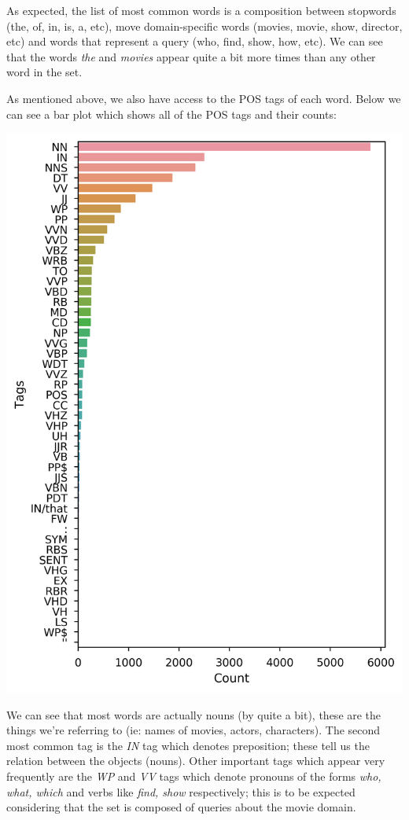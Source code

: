 \documentclass[11pt,a4paper]{article}
\begin{document}
	As expected, the list of most common words is a composition between stopwords (the, of, in, is, a, etc), move domain-specific words (movies, movie, show, director, etc) and words that represent a query (who, find, show, how, etc). We can see that the words \textit{the} and \textit{movies} appear quite a bit more times than any other word in the set.
	
	As mentioned above, we also have access to the POS tags of each word. Below we can see a bar plot which shows all of the POS tags and their counts:

	\hspace*{-0.7cm}\includegraphics[scale=0.6]{barplot_pos_counts}
	
	We can see that most words are actually nouns (by quite a bit), these are the things we're referring to (ie: names of movies, actors, characters). The second most common tag is the \textit{IN} tag which denotes preposition; these tell us the relation between the objects (nouns). Other important tags which appear very frequently are the \textit{WP} and \textit{VV} tags which denote pronouns of the forms \textit{who, what, which} and verbs like \textit{find, show} respectively; this is to be expected considering that the set is composed of queries about the movie domain.
\end{document}
